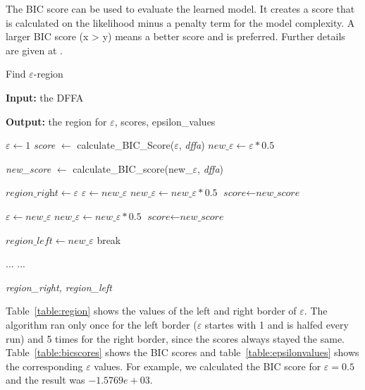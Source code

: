 \documentclass[
a4paper,     %
12pt         %
]{scrartcl}  %
\begin{document}
The BIC score can be used to evaluate the learned model. It creates a score that is calculated on the likelihood minus a penalty term for the model complexity. A larger BIC score (x > y) means a better score and is preferred. Further details are given at \cite{Mao.}.

\begin{algorithm}[H]
\caption{Find $\varepsilon$-region}\label{alg:findregion}
\begin{algorithmic}[1]
\item \textbf{Input:} the DFFA
\item \textbf{Output:} the region for $\varepsilon$, scores, epsilon\_values

\State $\varepsilon \gets \textit{1}$
\State \textit{score} $\gets$ calculate\_BIC\_Score($\varepsilon$, \textit{dffa})
\State $new\_\varepsilon \gets \varepsilon * 0.5$

       
       \State \textit{new\_score} $\gets$ calculate\_BIC\_score(new\_$\varepsilon$, \textit{dffa})
       
           \label{findregion:scorelarger}
         \State $\textit{region\_right} \gets \varepsilon$
         \State $\varepsilon \gets new\_\varepsilon$
         \State $ new\_\varepsilon \gets new\_\varepsilon * 0.5$
         \State $\textit{score} \gets \textit{new\_score} $
       
           \label{findregion:scorethesame}
   	 \State $\varepsilon \gets new\_\varepsilon$
         \State $ new\_\varepsilon \gets new\_\varepsilon * 0.5$
         \State $\textit{score} \gets \textit{new\_score} $ 
       
      \Else \label{findregion:scoresmaller}
      \State $\textit{region\_left} \gets new\_\varepsilon$
        \State break
       \EndIf      
 
  \EndWhile
  
  \State ...
  \State ...

\State \Return \textit{region\_right, region\_left}
\end{algorithmic}
\end{algorithm}

Table~\ref{table:region} shows the values of the left and right border of $\varepsilon$. The algorithm ran only once for the left border ($\varepsilon$ startes with 1 and is halfed every run) and 5 times for the right border, since the scores always stayed the same. Table~\ref{table:bicscores} shows the BIC scores and table~\ref{table:epsilonvalues} shows the corresponding $\varepsilon$ values. For example, we calculated the BIC score for $\varepsilon = 0.5$ and the result was $-1.5769e+03$.
\end{document}
